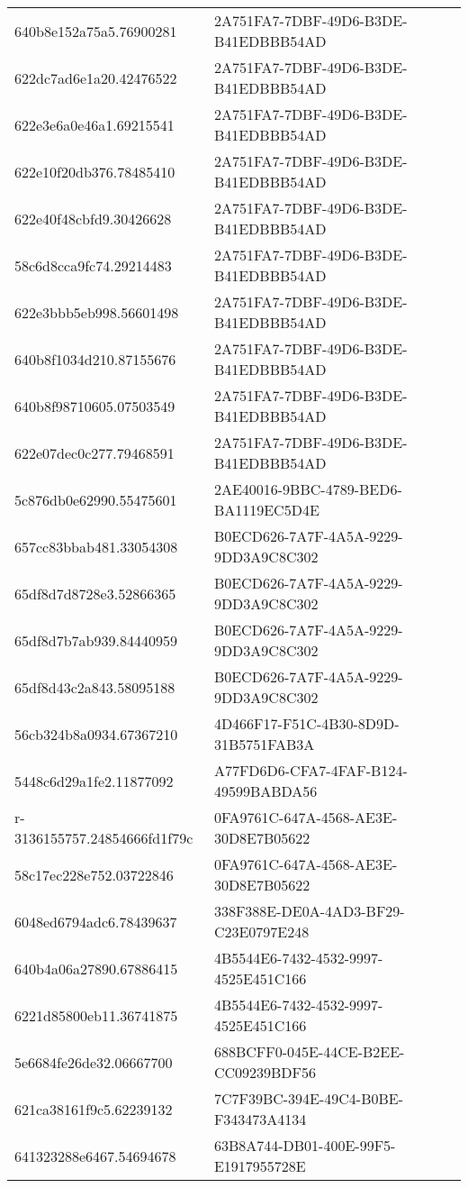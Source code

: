 \begin{tabular}{ll}
640b8e152a75a5.76900281 & 2A751FA7-7DBF-49D6-B3DE-B41EDBBB54AD \\
622dc7ad6e1a20.42476522 & 2A751FA7-7DBF-49D6-B3DE-B41EDBBB54AD \\
622e3e6a0e46a1.69215541 & 2A751FA7-7DBF-49D6-B3DE-B41EDBBB54AD \\
622e10f20db376.78485410 & 2A751FA7-7DBF-49D6-B3DE-B41EDBBB54AD \\
622e40f48cbfd9.30426628 & 2A751FA7-7DBF-49D6-B3DE-B41EDBBB54AD \\
58c6d8cca9fc74.29214483 & 2A751FA7-7DBF-49D6-B3DE-B41EDBBB54AD \\
622e3bbb5eb998.56601498 & 2A751FA7-7DBF-49D6-B3DE-B41EDBBB54AD \\
640b8f1034d210.87155676 & 2A751FA7-7DBF-49D6-B3DE-B41EDBBB54AD \\
640b8f98710605.07503549 & 2A751FA7-7DBF-49D6-B3DE-B41EDBBB54AD \\
622e07dec0c277.79468591 & 2A751FA7-7DBF-49D6-B3DE-B41EDBBB54AD \\
5c876db0e62990.55475601 & 2AE40016-9BBC-4789-BED6-BA1119EC5D4E \\
657cc83bbab481.33054308 & B0ECD626-7A7F-4A5A-9229-9DD3A9C8C302 \\
65df8d7d8728e3.52866365 & B0ECD626-7A7F-4A5A-9229-9DD3A9C8C302 \\
65df8d7b7ab939.84440959 & B0ECD626-7A7F-4A5A-9229-9DD3A9C8C302 \\
65df8d43c2a843.58095188 & B0ECD626-7A7F-4A5A-9229-9DD3A9C8C302 \\
56cb324b8a0934.67367210 & 4D466F17-F51C-4B30-8D9D-31B5751FAB3A \\
5448c6d29a1fe2.11877092 & A77FD6D6-CFA7-4FAF-B124-49599BABDA56 \\
r-3136155757.24854666fd1f79c & 0FA9761C-647A-4568-AE3E-30D8E7B05622 \\
58c17ec228e752.03722846 & 0FA9761C-647A-4568-AE3E-30D8E7B05622 \\
6048ed6794adc6.78439637 & 338F388E-DE0A-4AD3-BF29-C23E0797E248 \\
640b4a06a27890.67886415 & 4B5544E6-7432-4532-9997-4525E451C166 \\
6221d85800eb11.36741875 & 4B5544E6-7432-4532-9997-4525E451C166 \\
5e6684fe26de32.06667700 & 688BCFF0-045E-44CE-B2EE-CC09239BDF56 \\
621ca38161f9c5.62239132 & 7C7F39BC-394E-49C4-B0BE-F343473A4134 \\
641323288e6467.54694678 & 63B8A744-DB01-400E-99F5-E1917955728E \\

\end{tabular}
